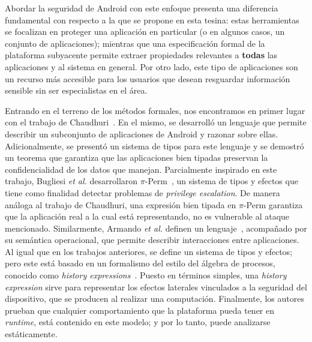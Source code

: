 Abordar la seguridad de Android con este enfoque presenta una diferencia
fundamental con respecto a la que se propone en esta tesina: estas herramientas
se focalizan en proteger una aplicación en particular (o en algunos casos, un
conjunto de aplicaciones); mientras que una especificación formal de la
plataforma subyacente permite extraer propiedades relevantes a \textbf{todas}
las aplicaciones y al sistema en general. Por otro lado, este tipo de
aplicaciones son un recurso más accesible para los usuarios que desean
resguardar información sensible sin ser especialistas en el área.





Entrando en el terreno de los métodos formales, nos encontramos en primer lugar
con el trabajo de Chaudhuri~\cite{chaudhuri}. En el mismo, se desarrolló un
lenguaje que permite describir un subconjunto de aplicaciones de Android y
razonar sobre ellas. Adicionalmente, se presentó un sistema de tipos para este
lenguaje y se demostró un teorema que garantiza que las aplicaciones bien
tipadas preservan la confidencialidad de los datos que manejan. Parcialmente
inspirado en este trabajo, Bugliesi \textit{et al.} desarrollaron
$\pi$-Perm~\cite{bugliesi}, un sistema de tipos y efectos que tiene como
finalidad detectar problemas de \textit{privilege escalation}. De manera análoga
al trabajo de Chaudhuri, una expresión bien tipada en $\pi$-Perm garantiza que
la aplicación real a la cual está representando, no es vulnerable al ataque
mencionado. Similarmente, Armando \textit{et al.} definen un
lenguaje~\cite{armando}, acompañado por su semántica operacional, que permite
describir interacciones entre aplicaciones. Al igual que en los trabajos
anteriores, se define un sistema de tipos y efectos; pero este está basado en un
formalismo del estilo del álgebra de procesos, conocido como \textit{history
expressions}~\cite{history-expressions}. Puesto en términos simples, una
\textit{history expression} sirve para representar los efectos laterales
vinculados a la seguridad del dispositivo, que se producen al realizar una
computación. Finalmente, los autores prueban que cualquier comportamiento que la
plataforma pueda tener en \textit{runtime}, está contenido en este modelo; y por
lo tanto, puede analizarse estáticamente.

